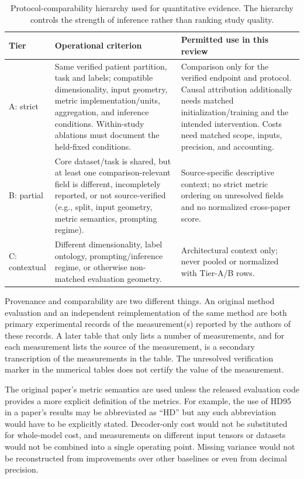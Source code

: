 \documentclass[5p,times,authoryear]{elsarticle}
\begin{document}
\begin{table}[t]
\centering
\caption{Protocol-comparability hierarchy used for quantitative evidence. The hierarchy controls the strength of inference rather than ranking study quality.}
\label{tab:comparability_tiers}
\footnotesize
\renewcommand{\arraystretch}{1.08}

\begin{tabularx}{\textwidth}{>{\raggedright\arraybackslash}p{1.6cm}>{\raggedright\arraybackslash}p{7.1cm}>{\raggedright\arraybackslash}X}
\toprule
\textbf{Tier} & \textbf{Operational criterion} & \textbf{Permitted use in this review} \\
\midrule
A: strict & Same verified patient partition, task and labels; compatible dimensionality, input geometry, metric implementation/units, aggregation, and inference conditions. Within-study ablations must document the held-fixed conditions. & Comparison only for the verified endpoint and protocol. Causal attribution additionally needs matched initialization/training and the intended intervention. Costs need matched scope, inputs, precision, and accounting. \\
B: partial & Core dataset/task is shared, but at least one comparison-relevant field is different, incompletely reported, or not source-verified (e.g., split, input geometry, metric semantics, prompting regime). & Source-specific descriptive context; no strict metric ordering on unresolved fields and no normalized cross-paper score. \\
C: contextual & Different dimensionality, label ontology, prompting/inference regime, or otherwise non-matched evaluation geometry. & Architectural context only; never pooled or normalized with Tier-A/B rows. \\
\bottomrule
\end{tabularx}
\end{table}

Provenance and comparability are two different things. An original method evaluation and an independent reimplementation of the same method are both primary experimental records of the measurement(s) reported by the authors of these records. A later table that only lists a number of measurements, and for each measurement lists the source of the measurement, is a secondary transcription of the measurements in the table. The unresolved verification marker in the numerical tables does not certify the value of the measurement.

The original paper’s metric semantics are used unless the released evaluation code provides a more explicit definition of the metrics. For example, the use of HD95 in a paper’s results may be abbreviated as “HD” but any such abbreviation would have to be explicitly stated. Decoder-only cost would not be substituted for whole-model cost, and measurements on different input tensors or datasets would not be combined into a single operating point. Missing variance would not be reconstructed from improvements over other baselines or even from decimal precision.
\end{document}
